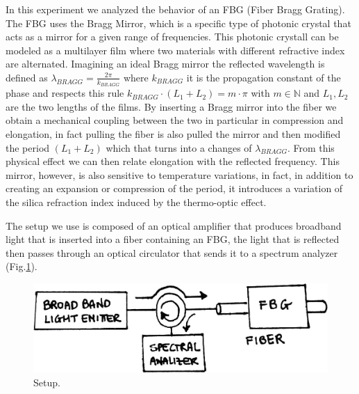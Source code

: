 
In this experiment we analyzed the behavior of an FBG (Fiber Bragg Grating). The FBG uses the Bragg Mirror, which is a specific type of photonic crystal that acts as a mirror for a given range of frequencies. This photonic crystall can be modeled as a multilayer film where two materials with different refractive index are alternated. Imagining an ideal Bragg mirror the reflected wavelength is defined as $\lambda_{BRAGG} = \frac{2\pi}{k_{BRAGG}}$ where $k_{BRAGG}$ it is the propagation constant of the phase and respects this rule $k_{BRAGG} \cdot (L_1 + L_2) = m \cdot \pi$ with $m \in \mathbb{N}$ and $L_1, L_2$ are the two lengths of the films. By inserting a Bragg mirror into the fiber we obtain a mechanical coupling between the two in particular in compression and elongation, in fact pulling the fiber is also pulled the mirror and then modified the period $(L_1 + L_2)$ which that turns into a changes of $\lambda_{BRAGG}$. From this physical effect we can then relate elongation with the reflected frequency. This mirror, however, is also sensitive to temperature variations, in fact, in addition to creating an expansion or compression of the period, it introduces a variation of the silica refraction index induced by the thermo-optic effect.

The setup we use is composed of an optical amplifier that produces broadband light that is inserted into a fiber containing an FBG, the light that is reflected then passes through an optical circulator that sends it to a spectrum analyzer (Fig.\ref{fig:setup}).
\begin{figure}[h]
    \centering
    \includegraphics[scale=0.3]{img/setup.jpg}
    \caption{Setup.}
    \label{fig:setup}
\end{figure}

